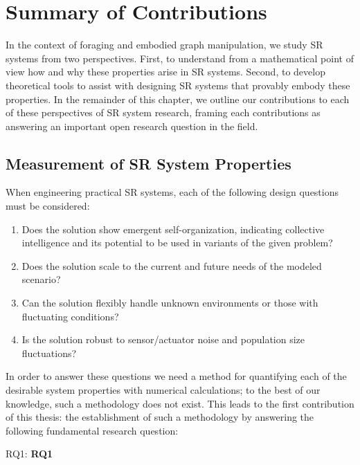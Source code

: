 \section{Summary of Contributions}
%
In the context of foraging and embodied graph manipulation, we study SR
systems from two perspectives. First, to understand from a mathematical point of
view how and why these properties arise in SR systems. Second, to develop
theoretical tools to assist with designing SR systems that provably
embody these properties.  In the remainder of this chapter, we outline our
contributions to each of these perspectives of SR system research,
framing each contributions as answering an important open research question in
the field.

\subsection{Measurement of SR System Properties }
%
When engineering practical SR systems, each of the following design
questions must be considered:
%
\begin{enumerate}
\item {Does the solution show emergent self-organization, indicating collective
    intelligence and its potential to be used in variants of the given problem?
  }
\item{Does the solution scale to the current and future needs of the modeled
    scenario?}
\item {Can the solution flexibly handle unknown environments or those with
    fluctuating conditions?}

\item {Is the solution robust to sensor/actuator noise and population size
    fluctuations?
  }
\end{enumerate}
%
In order to answer these questions we need a method for quantifying
each of the desirable system properties with numerical calculations; to the best
of our knowledge, such a methodology does not exist. This leads to the first
contribution of this thesis: the establishment of such a methodology by
answering the following fundamental research question:

\medskip\noindent
\gls{RQ1}: \textbf{\Glsdesc{RQ1}}
\medskip

